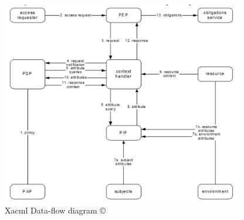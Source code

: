 
 
 \begin{figure}[tbh]
\begin{center}
\includegraphics[height=3.5in]{xacml.png}
\caption{Xacml Data-flow diagram  \copyright \cite{xacml}}
\end{center}
\end{figure}
 

